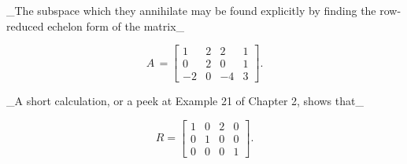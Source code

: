 _The subspace which they annihilate may be found explicitly by finding the row-reduced echelon form of the matrix_

\[A\,=\!\left[\begin{array}{cccc}1&2&2&1\\ 0&2&0&1\\ -2&0&-4&3\end{array}\right]\!.\]

_A short calculation, or a peek at Example 21 of Chapter 2, shows that_

\[R=\!\left[\begin{array}{cccc}1&0&2&0\\ 0&1&0&0\\ 0&0&0&1\end{array}\right]\!.\] 